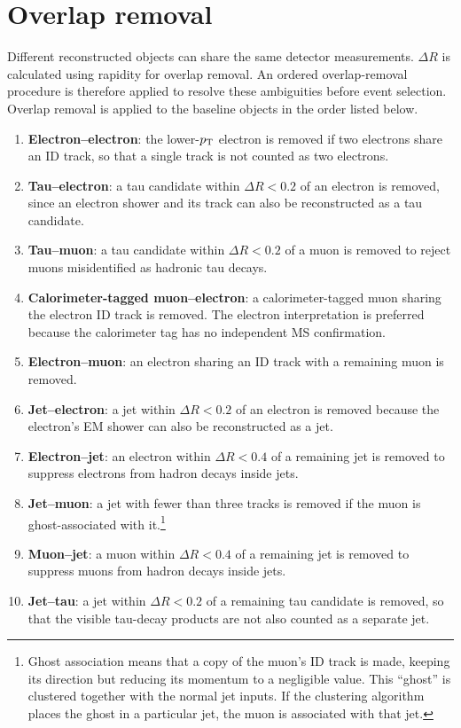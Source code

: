 \section{Overlap removal}
\label{sec:ch6_overlap}

Different reconstructed objects can share the same detector measurements.
$\Delta R$ is calculated using rapidity for overlap removal.
An ordered overlap-removal procedure is therefore applied to resolve these ambiguities before event selection.
Overlap removal is applied to the baseline objects in the order listed below.
\begin{enumerate}
    \item \textbf{Electron--electron}: the lower-$p_{\mathrm{T}}$ electron is removed if two electrons share an ID track, so that a single track is not counted as two electrons.
    \item \textbf{Tau--electron}: a tau candidate within $\Delta R<0.2$ of an electron is removed, since an electron shower and its track can also be reconstructed as a tau candidate.
    \item \textbf{Tau--muon}: a tau candidate within $\Delta R<0.2$ of a muon is removed to reject muons misidentified as hadronic tau decays.
    \item \textbf{Calorimeter-tagged muon--electron}: a calorimeter-tagged muon sharing the electron ID track is removed. The electron interpretation is preferred because the calorimeter tag has no independent MS confirmation.
    \item \textbf{Electron--muon}: an electron sharing an ID track with a remaining muon is removed.
    \item \textbf{Jet--electron}: a jet within $\Delta R<0.2$ of an electron is removed because the electron's EM shower can also be reconstructed as a jet.
    \item \textbf{Electron--jet}: an electron within $\Delta R<0.4$ of a remaining jet is removed to suppress electrons from hadron decays inside jets.
    \item \textbf{Jet--muon}: a jet with fewer than three tracks is removed if the muon is ghost-associated with it.\footnote{Ghost association means that a copy of the muon's ID track is made, keeping its direction but reducing its momentum to a negligible value. This ``ghost'' is clustered together with the normal jet inputs. If the clustering algorithm places the ghost in a particular jet, the muon is associated with that jet.}
    \item \textbf{Muon--jet}: a muon within $\Delta R<0.4$ of a remaining jet is removed to suppress muons from hadron decays inside jets.
    \item \textbf{Jet--tau}: a jet within $\Delta R<0.2$ of a remaining tau candidate is removed, so that the visible tau-decay products are not also counted as a separate jet.
\end{enumerate}
